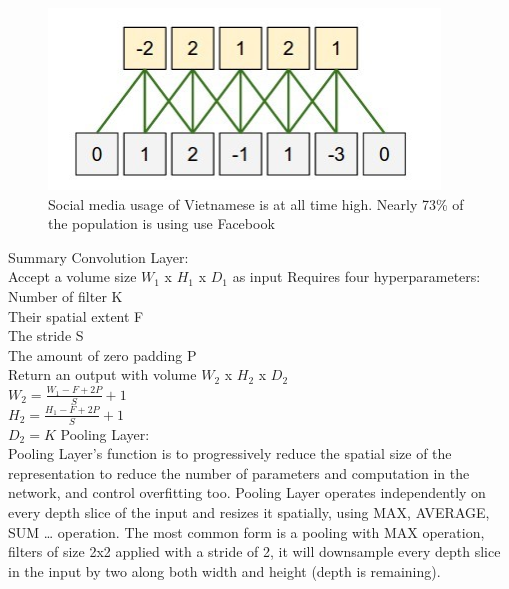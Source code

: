 \begin{center}
  \begin{figure}[H]
  \centering
  \includegraphics[width=1\columnwidth]{images/chap2/Output_volume_WSP.png}
  \caption{Social media usage of Vietnamese is at all time high. Nearly 73\% of the population is using use Facebook}
  \label{chap2:WSP}
  \end{figure}
\end{center}
Summary Convolution Layer:\\
Accept a volume size $W_{1}$ x $H_{1}$ x $D_{1}$ as input
Requires four hyperparameters:\\
Number of filter K\\
Their spatial extent F \\
The stride S\\
The amount of zero padding P\\
Return an output with volume $W_{2}$ x $H_{2}$ x $D_{2}$\\
$W_{2} = \frac{W_{1} - F + 2P }{S} + 1$\\
$H_{2} = \frac{H_{1} - F + 2P }{S} + 1$\\
$D_{2} = K$
Pooling Layer: \\
Pooling Layer's function is to progressively reduce the spatial size of the representation to reduce the number of parameters and computation in the network, and control overfitting too. Pooling Layer operates independently on every depth slice of the input and resizes it spatially, using MAX, AVERAGE, SUM … operation. The most common form is a pooling with MAX operation, filters of size 2x2 applied with a stride of 2, it will downsample every depth slice in the input by two along both width and height (depth is remaining).\\
